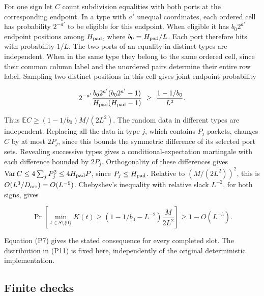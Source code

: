 \documentclass[
  11pt,
]{article}
\begin{document}
For one sign let \(C\) count subdivision equalities with both ports at
the corresponding endpoint. In a type with \(a'\) unequal coordinates,
each ordered cell has probability \(2^{-a'}\) to be eligible for this
endpoint. When eligible it has \(b_0 2^{a'}\) endpoint positions among
\(H_{\rm pad}\), where \(b_0=H_{\rm pad}/L\). Each port therefore hits
with probability \(1/L\). The two ports of an equality in distinct types
are independent. When in the same type they belong to the same ordered
cell, since their common column label and the unordered pairs determine
their entire row label. Sampling two distinct positions in this cell
gives joint endpoint probability

\[
 2^{-a'}\frac{b_0 2^{a'}(b_0 2^{a'}-1)}
                 {H_{\rm pad}(H_{\rm pad}-1)}
       \ \ge\ \frac{1-1/b_0}{L^2}.
\]

Thus \(\mathbb EC\ge(1-1/b_0)M/(2L^2)\). The random data in different
types are independent. Replacing all the data in type \(j\), which
contains \(P_j\) packets, changes \(C\) by at most \(2P_j\), since this
bounds the symmetric difference of its selected port sets. Revealing
successive types gives a conditional-expectation martingale with each
difference bounded by \(2P_j\). Orthogonality of these differences gives
\(\operatorname{Var}C\le4\sum_j P_j^2\le4H_{\rm pad}P\), since
\(P_j\le H_{\rm pad}\). Relative to \((M/(2L^2))^2\), this is
\(O(L^3/D_{\rm arr})=O(L^{-9})\). Chebyshev's inequality with relative
slack \(L^{-2}\), for both signs, gives

\[
 \Pr\left[\min_{t\in S\setminus\{0\}}K(t)\ge
          (1-1/b_0-L^{-2})\frac{M}{2L^2}\right]
       \ge 1-O(L^{-5}).
 \tag{P11}
\]

Equation (P7) gives the stated consequence for every completed slot. The
distribution in (P11) is fixed here, independently of the original
deterministic implementation.

\subsection{Finite checks}\label{v9-finite-checks}
\end{document}
